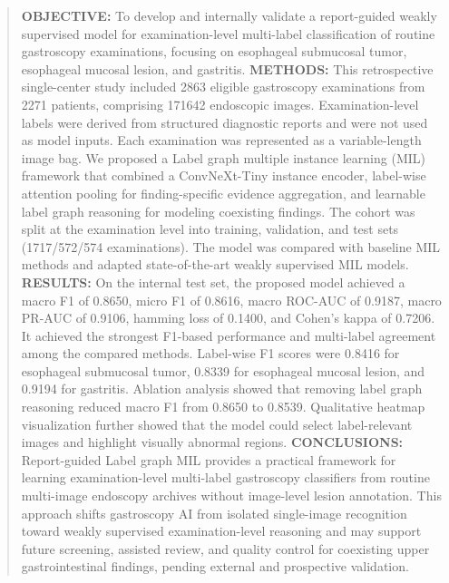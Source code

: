 \documentclass[Afour,sagev,times]{sagej}
\begin{document}
\begin{abstract}
\textbf{OBJECTIVE:} To develop and internally validate a report-guided weakly supervised model for examination-level multi-label classification of routine gastroscopy examinations, focusing on esophageal submucosal tumor, esophageal mucosal lesion, and gastritis. \textbf{METHODS:} This retrospective single-center study included 2863 eligible gastroscopy examinations from 2271 patients, comprising 171642 endoscopic images. Examination-level labels were derived from structured diagnostic reports and were not used as model inputs. Each examination was represented as a variable-length image bag. We proposed a Label graph multiple instance learning (MIL) framework that combined a ConvNeXt-Tiny instance encoder, label-wise attention pooling for finding-specific evidence aggregation, and learnable label graph reasoning for modeling coexisting findings. The cohort was split at the examination level into training, validation, and test sets (1717/572/574 examinations). The model was compared with baseline MIL methods and adapted state-of-the-art weakly supervised MIL models. \textbf{RESULTS:} On the internal test set, the proposed model achieved a macro F1 of 0.8650, micro F1 of 0.8616, macro ROC-AUC of 0.9187, macro PR-AUC of 0.9106, hamming loss of 0.1400, and Cohen's kappa of 0.7206. It achieved the strongest F1-based performance and multi-label agreement among the compared methods. Label-wise F1 scores were 0.8416 for esophageal submucosal tumor, 0.8339 for esophageal mucosal lesion, and 0.9194 for gastritis. Ablation analysis showed that removing label graph reasoning reduced macro F1 from 0.8650 to 0.8539. Qualitative heatmap visualization further showed that the model could select label-relevant images and highlight visually abnormal regions. \textbf{CONCLUSIONS:} Report-guided Label graph MIL provides a practical framework for learning examination-level multi-label gastroscopy classifiers from routine multi-image endoscopy archives without image-level lesion annotation. This approach shifts gastroscopy AI from isolated single-image recognition toward weakly supervised examination-level reasoning and may support future screening, assisted review, and quality control for coexisting upper gastrointestinal findings, pending external and prospective validation.


\end{abstract}
\end{document}

